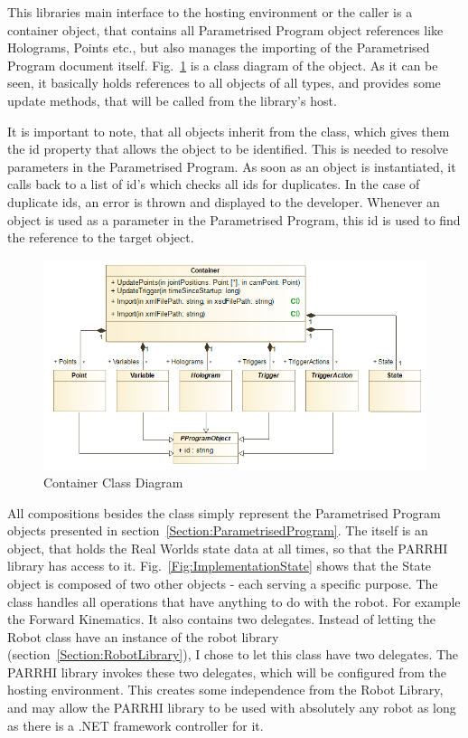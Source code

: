 This libraries main interface to the hosting environment or the caller is a container object, that contains all Parametrised Program object references like Holograms, Points etc., but also manages the importing of the Parametrised Program document itself. Fig.~\ref{Fig:ImplementationContainer} is a class diagram of the  object. As it can be seen, it basically holds references to all objects of all types, and provides some update methods, that will be called from the library's host.

It is important to note, that all objects inherit from the  class, which gives them the id property that allows the object to be identified. This is needed to resolve parameters in the Parametrised Program. As soon as an object is instantiated, it calls back to a list of id's which checks all ids for duplicates. In the case of duplicate ids, an error is thrown and displayed to the developer. Whenever an object is used as a parameter in the Parametrised Program, this id is used to find the reference to the target object.

\begin{figure}[!h]
	\centering
	\includegraphics[width=1\linewidth]{Figures/Implementation_Container}
	\caption[Container Class Diagram]{Container Class Diagram}
	\label{Fig:ImplementationContainer}
\end{figure}

All compositions besides the  class simply represent the Parametrised Program objects presented in section~\ref{Section:ParametrisedProgram}. The  itself is an object, that holds the Real Worlds state data at all times, so that the PARRHI library has access to it. Fig.~\ref{Fig:ImplementationState} shows that the State object is composed of two other objects - each serving a specific purpose. The  class handles all operations that have anything to do with the robot. For example the Forward Kinematics. It also contains two delegates. Instead of letting the Robot class have an instance of the robot library (section~\ref{Section:RobotLibrary}), I chose to let this class have two delegates. The PARRHI library invokes these two delegates, which will be configured from the hosting environment. This creates some independence from the Robot Library, and may allow the PARRHI library to be used with absolutely any robot as long as there is a .NET framework controller for it.


